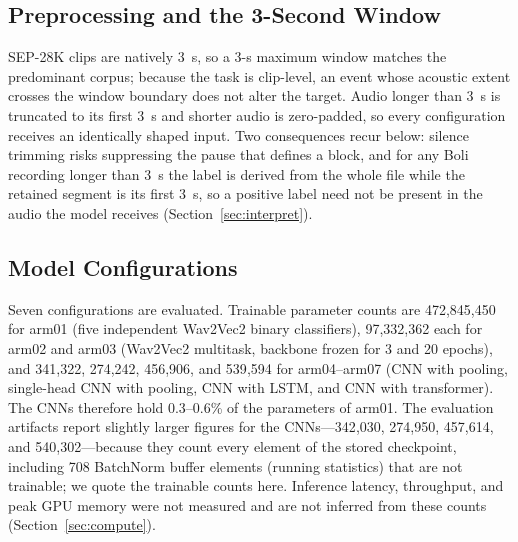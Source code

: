 \documentclass[a4paper,orivec]{llncs}
\begin{document}
\subsection{Preprocessing and the 3-Second Window}
\label{sec:win}
SEP-28K clips are natively 3~s, so a 3-s maximum window matches the predominant
corpus; because the task is clip-level, an event whose acoustic extent crosses the
window boundary does not alter the target. Audio longer than 3~s is truncated to
its first 3~s and shorter audio is zero-padded, so every configuration receives an
identically shaped input. Two consequences recur below: silence trimming risks
suppressing the pause that defines a block, and for any Boli recording longer
than 3~s the label is derived from the whole file while the retained segment is
its first 3~s, so a positive label need not be present in the audio the model
receives (Section~\ref{sec:interpret}).

\subsection{Model Configurations}
Seven configurations are evaluated. Trainable parameter counts are 472{,}845{,}450
for arm01 (five independent Wav2Vec2 binary classifiers), 97{,}332{,}362 each for
arm02 and arm03 (Wav2Vec2 multitask, backbone frozen for 3 and 20 epochs), and
341{,}322, 274{,}242, 456{,}906, and 539{,}594 for arm04--arm07 (CNN with pooling,
single-head CNN with pooling, CNN with LSTM, and CNN with transformer). The CNNs
therefore hold 0.3--0.6\% of the parameters of arm01. The evaluation artifacts
report slightly larger figures for the CNNs---342{,}030, 274{,}950, 457{,}614, and
540{,}302---because they count every element of the stored checkpoint, including
708 BatchNorm buffer elements (running statistics) that are not trainable; we quote
the trainable counts here. Inference latency,
throughput, and peak GPU memory were not measured and are not inferred from these
counts (Section~\ref{sec:compute}).
\end{document}
